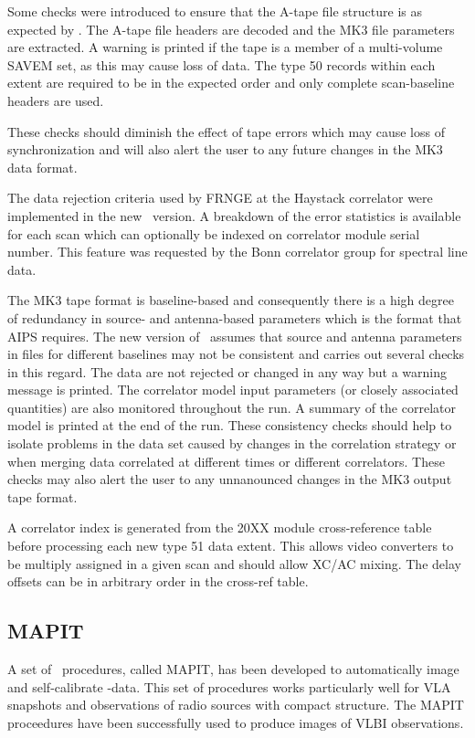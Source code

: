 \begin{description}
Some checks were introduced to ensure that the A-tape file
structure is as expected by \MKTIN. The A-tape file headers are
decoded and the MK3 file parameters are extracted. A warning is
printed if the tape is a member of a multi-volume SAVEM set, as
this may cause loss of data.  The type 50 records within each
extent are required to be in the expected order and only
complete scan-baseline headers are used.

These checks should diminish the effect of tape errors which
may cause loss of synchronization and will also alert the user
to any future changes in the MK3 data format.

The data rejection criteria used by FRNGE at the Haystack
correlator were implemented in the new \MKTIN\ version. A
breakdown of the error statistics is available for each scan
which can optionally be indexed on correlator module serial
number. This feature was requested by the Bonn correlator group
for spectral line data.

The MK3 tape format is baseline-based and consequently there
is a high degree of redundancy in source- and antenna-based
parameters which is the format that AIPS requires. The new
version of \MKTIN\ assumes that source and antenna parameters in
files for different baselines may not be consistent and carries
out several checks in this regard. The data are not rejected or
changed in any way but a warning message is printed. The
correlator model input parameters (or closely associated
quantities) are also monitored throughout the run. A summary of
the correlator model is printed at the end of the run.
These consistency checks should help to isolate problems in
the data set caused by changes in the correlation strategy or
when merging data correlated at different times or different
correlators. These checks may also alert the user to any
unnanounced changes in the MK3 output tape format.

A correlator index is generated from the 20XX module
cross-reference table before processing each new type 51 data
extent. This allows video converters to be multiply assigned in
a given scan and should allow XC/AC mixing. The delay offsets
can be in arbitrary order in the cross-ref table.
\end{description}

\subsection{MAPIT}
A set of \AIPS\ procedures, called {\sc MAPIT},
 has been developed to automatically
image and self-calibrate \UV-data.  This set of procedures
works particularly well for VLA snapshots and observations of
radio sources with compact structure.  The {\sc MAPIT} proceedures
have been successfully used to produce images of VLBI observations.

